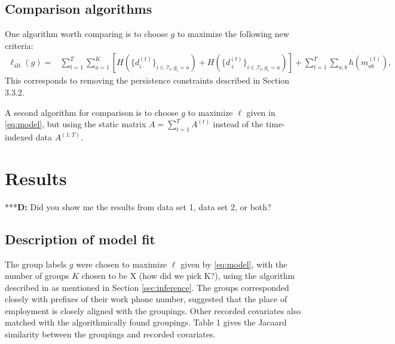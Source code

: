 \documentclass{article}
\begin{document}


\subsection{Comparison algorithms} \label{sec:other algorithms}

One algorithm worth comparing is to choose $g$ to maximize the following new criteria:
\begin{align} \label{eq:alternative}
\ell_{\textrm{alt}}(g) =& \sum_{t=1}^T \sum_{a=1}^K \left[ H\left(\{d_{i\cdot}^{(t)}\}_{i \in \mathcal{I}_t, g_i=a}\right) + H\left(\{d_{\cdot i}^{(t)}\}_{i \in \mathcal{I}_t, g_i=a}\right) \right] + \sum_{t=1}^T \sum_{a,b} h(m_{ab}^{(t)}),
\end{align}
This corresponds to removing the persistence constraints described in Section 3.3.2.

A second algorithm for comparison is to choose $g$ to maximize $\ell$ given in \eqref{eq:model}, but using the static matrix $A = \sum_{t=1}^T A^{(t)}$ instead of the time-indexed data $A^{(1:T)}$.

\section{Results}

***\textbf{D:} Did you show me the results from data set 1, data set 2, or both? 

\subsection{Description of model fit}
The group labels $g$ were chosen to maximize $\ell$ given by \eqref{eq:model}, with the number of groups $K$ chosen to be X (how did we pick K?), using the algorithm described in \cite{karrer2011stochastic} as mentioned in Section \ref{sec:inference}. The groups corresponded closely with prefixes of their work phone number, suggested that the place of employment is closely aligned with the groupings. Other recorded covariates also matched with the algorithmically found groupings. Table 1 gives the Jacaard similarity between the groupings and recorded covariates. 
\end{document}
